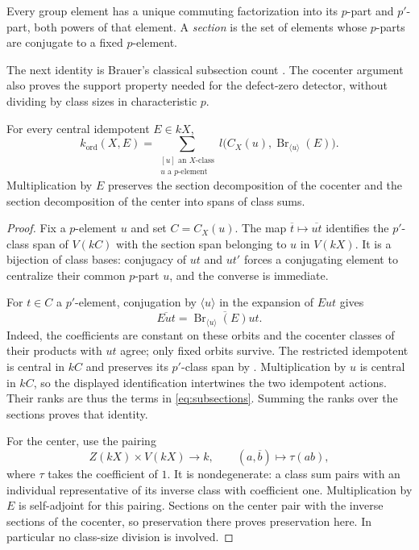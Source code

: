 Every group element has a unique commuting factorization into its
$p$-part and $p'$-part, both powers of that element. A
\emph{section} is the set of elements whose $p$-parts are conjugate
to a fixed $p$-element.

The next identity is Brauer's classical subsection count
\cite{Brauer1959}. The cocenter argument also proves the support
property needed for the defect-zero detector, without dividing by
class sizes in characteristic $p$.

\begin{lemma}\label{lem:subsections}
For every central idempotent $E\in kX$,
\begin{equation}\label{eq:subsections}
 k_{\mathrm{ord}}(X,E)=
 \sum_{\substack{[u]\text{ an }X\text{-class}\\u\text{ a }p\text{-element}}}
 l\bigl(C_X(u),\operatorname{Br}_{\langle u\rangle}(E)\bigr).
\end{equation}
Multiplication by $E$ preserves the section decomposition of the
cocenter and the section decomposition of the center into spans
of class sums.
\end{lemma}

\begin{proof}
Fix a $p$-element $u$ and set $C=C_X(u)$. The map
$\overline t\mapsto\overline{ut}$ identifies the $p'$-class span
of $V(kC)$ with the section span belonging to $u$ in $V(kX)$.
It is a bijection of class bases: conjugacy of $ut$ and $ut'$
forces a conjugating element to centralize their common $p$-part
$u$, and the converse is immediate.

For $t\in C$ a $p'$-element, conjugation by $\langle u\rangle$
in the expansion of $Eut$ gives
\[
 \overline{Eut}
   =\overline{\operatorname{Br}_{\langle u\rangle}(E)ut}.
\]
Indeed, the coefficients are constant on these orbits and the
cocenter classes of their products with $ut$ agree; only fixed
orbits survive. The restricted idempotent is central in $kC$ and
preserves its $p'$-class span by .
Multiplication by $u$ is central in $kC$, so the displayed
identification intertwines the two idempotent actions. Their ranks
are thus the terms in \eqref{eq:subsections}. Summing the ranks
over the sections proves that identity.

For the center, use the pairing
\[
 Z(kX)\times V(kX)\longrightarrow k,
 \qquad (a,\overline b)\longmapsto\tau(ab),
\]
where $\tau$ takes the coefficient of $1$. It is nondegenerate:
a class sum pairs with an individual representative of its inverse
class with coefficient one. Multiplication by $E$ is self-adjoint
for this pairing. Sections on the center pair with the inverse
sections of the cocenter, so preservation there proves preservation
here. In particular no class-size division is involved.
\end{proof}

